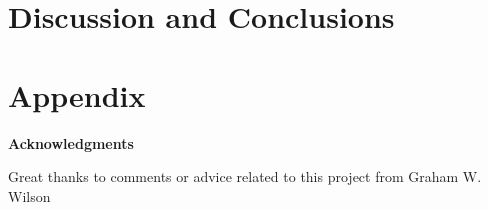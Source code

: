 \documentclass[12pt]{article}
\def\Acknowledgments{\bigskip  \bigskip \begin{center} \begin{large}
             \bf Acknowledgments \end{large}\end{center}}
\begin{document}






\section{Discussion and Conclusions}
\label{conclude}



\section{Appendix}
\label{sec:Appendix}





\Acknowledgments
Great thanks to comments or advice related to this project from Graham W. Wilson

%



\end{document}
